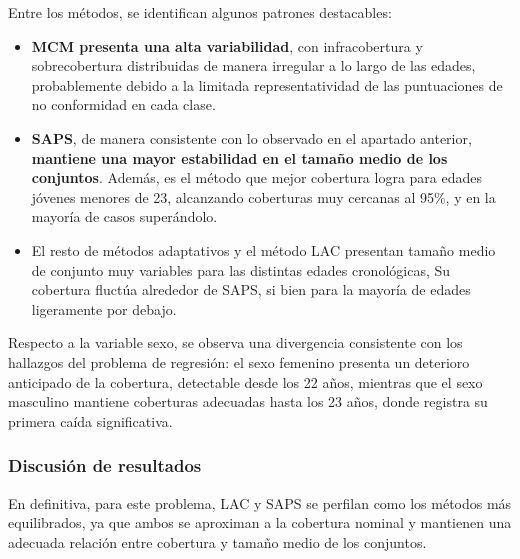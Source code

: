 Entre los métodos, se identifican algunos patrones destacables:

\begin{itemize}

    \item \textbf{MCM presenta una alta variabilidad}, con infracobertura y sobrecobertura distribuidas de manera irregular a lo largo de las edades, probablemente debido a la limitada representatividad de las puntuaciones de no conformidad en cada clase.
    
    
    \item \textbf{SAPS}, de manera consistente con lo observado en el apartado anterior, \textbf{mantiene una mayor estabilidad en el tamaño medio de los conjuntos}. Además, es el método que mejor cobertura logra para edades jóvenes menores de 23, alcanzando coberturas muy cercanas al 95\%, y en la mayoría de casos superándolo. 
    
    \item El resto de métodos adaptativos y el método LAC presentan tamaño medio de conjunto muy variables para las distintas edades cronológicas, Su cobertura fluctúa alrededor de SAPS, si bien para la mayoría de edades ligeramente por debajo.
    
\end{itemize}

Respecto a la variable sexo, se observa una divergencia consistente con los hallazgos del problema de regresión: el sexo femenino presenta un deterioro anticipado de la cobertura, detectable desde los 22 años, mientras que el sexo masculino mantiene coberturas adecuadas hasta los 23 años, donde registra su primera caída significativa. 


\subsubsection{Discusión de resultados}


En definitiva, para este problema, LAC y SAPS se perfilan como los métodos más equilibrados, ya que ambos se aproximan a la cobertura nominal y mantienen una adecuada relación entre cobertura y tamaño medio de los conjuntos.

